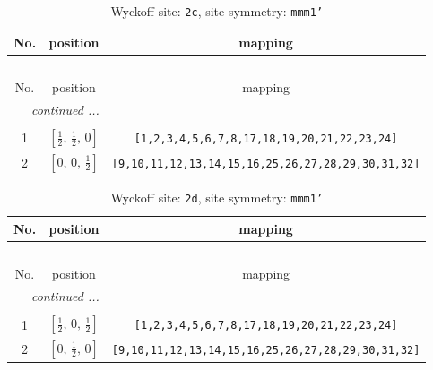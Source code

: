 \documentclass[fleqn,8pt]{jsarticle}
\begin{document}
\renewcommand{\arraystretch}{1.2}
\begin{longtable}{ccc}
\caption{Wyckoff site: {\tt 2c}, site symmetry: {\tt mmm1'}}
 \\
 \hline \hline
No. & position & mapping \\ \hline \endfirsthead

\multicolumn{2}{l}{\tablename\ \thetable{}} \\
 \hline \hline
No. & position & mapping \\ \hline \endhead

 \hline \hline
\multicolumn{2}{r}{\footnotesize\it continued ...} \\ \endfoot

 \hline \hline
\multicolumn{2}{r}{} \\ \endlastfoot

1 & $\left[ \frac{1}{2},\, \frac{1}{2},\, 0 \right]$ & {\tt [1,2,3,4,5,6,7,8,17,18,19,20,21,22,23,24]} \\ \hline
2 & $\left[ 0,\, 0,\, \frac{1}{2} \right]$ & {\tt [9,10,11,12,13,14,15,16,25,26,27,28,29,30,31,32]} \\
\end{longtable}
\renewcommand{\arraystretch}{1.2}
\begin{longtable}{ccc}
\caption{Wyckoff site: {\tt 2d}, site symmetry: {\tt mmm1'}}
 \\
 \hline \hline
No. & position & mapping \\ \hline \endfirsthead

\multicolumn{2}{l}{\tablename\ \thetable{}} \\
 \hline \hline
No. & position & mapping \\ \hline \endhead

 \hline \hline
\multicolumn{2}{r}{\footnotesize\it continued ...} \\ \endfoot

 \hline \hline
\multicolumn{2}{r}{} \\ \endlastfoot

1 & $\left[ \frac{1}{2},\, 0,\, \frac{1}{2} \right]$ & {\tt [1,2,3,4,5,6,7,8,17,18,19,20,21,22,23,24]} \\ \hline
2 & $\left[ 0,\, \frac{1}{2},\, 0 \right]$ & {\tt [9,10,11,12,13,14,15,16,25,26,27,28,29,30,31,32]} \\
\end{longtable}
\renewcommand{\arraystretch}{1.2}
\end{document}
